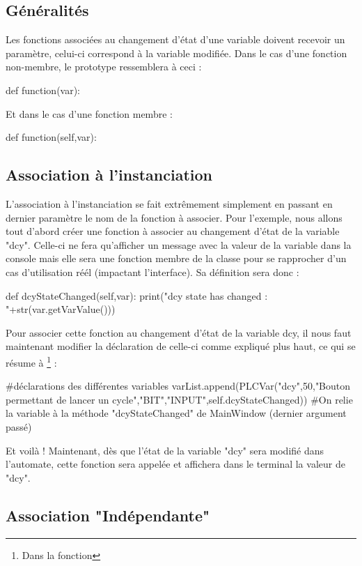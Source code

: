\documentclass[12pt]{report}    %
\begin{document}
\subsection{Généralités}

Les fonctions associées au changement d'état d'une variable doivent recevoir un paramètre, celui-ci correspond à la variable modifiée.
Dans le cas d'une fonction non-membre, le prototype ressemblera à ceci :
\begin{pyCode}
def function(var):
\end{pyCode}
Et dans le cas d'une fonction membre :
\begin{pyCode}
def function(self,var):
\end{pyCode}

\subsection{Association à l'instanciation}

L'association à l'instanciation se fait extrêmement simplement en passant en dernier paramètre le nom de la fonction à associer.\newline
Pour l'exemple, nous allons tout d'abord créer une fonction à associer au changement d'état de la variable "dcy". Celle-ci ne fera qu'afficher un message avec la valeur de la variable dans la console mais elle sera une fonction membre de la classe  pour se rapprocher d'un cas d'utilisation réél (impactant l'interface).\newline
Sa définition sera donc :
\begin{pyCode}
def dcyStateChanged(self,var):
		print("dcy state has changed : "+str(var.getVarValue()))
\end{pyCode}
\smallSkip
Pour associer cette fonction au changement d'état de la variable dcy, il nous faut maintenant modifier la déclaration de celle-ci comme expliqué plus haut, ce qui se résume à \footnote{Dans la fonction } :
\begin{pyCode}
#déclarations des différentes variables
varList.append(PLCVar("dcy",50,"Bouton permettant de lancer un cycle","BIT","INPUT",self.dcyStateChanged))
#On relie la variable à la méthode "dcyStateChanged" de MainWindow (dernier argument passé)
\end{pyCode}
 Et voilà ! Maintenant, dès que l'état de la variable "dcy" sera modifié dans l'automate, cette fonction sera appelée et affichera dans le terminal la valeur de "dcy".
 
 \subsection{Association "Indépendante"}
 
\end{document}
